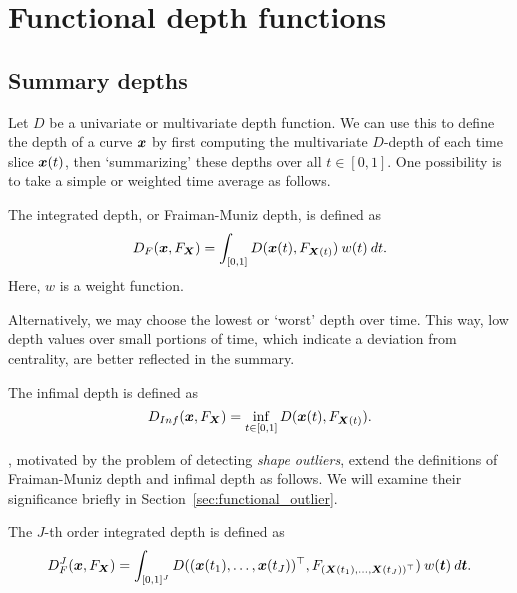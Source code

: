 \section{Functional depth functions}

\subsection{Summary depths}

Let $D$ be a univariate or multivariate depth function.
We can use this to define the depth of a curve $\bm{x}$ by first computing the
multivariate $D$-depth of each time slice $\bm{x}(t)$, then `summarizing' these
depths over all $t \in [0, 1]$.
One possibility is to take a simple or weighted time average as follows.

\begin{definition}
    \label{def:FM_depth}
    The integrated depth, or Fraiman-Muniz depth, is defined as
    \begin{equation}
        D_F(\bm{x}, F_{\bm{X}}) = \int_{[0, 1]} D(\bm{x}(t), F_{\bm{X}(t)})\:w(t)\:dt.
    \end{equation}
    Here, $w$ is a weight function.
\end{definition}

Alternatively, we may choose the lowest or `worst' depth over time.
This way, low depth values over small portions of time, which indicate a
deviation from centrality, are better reflected in the summary.

\begin{definition}
    The infimal depth is defined as
    \begin{equation}
        D_{Inf}(\bm{x}, F_{\bm{X}}) = \inf_{t \in [0, 1]} D(\bm{x}(t), F_{\bm{X}(t)}).
    \end{equation}
\end{definition}


\textcite{nagy-gijbels-hlubinka-2017}, motivated by the problem of detecting
\emph{shape outliers}, extend the definitions of Fraiman-Muniz depth and
infimal depth as follows.
We will examine their significance briefly in
Section~\ref{sec:functional_outlier}.

\begin{definition} \label{def:J_FM_depth}
    The $J$-th order integrated depth is defined as
    \begin{equation}
        D_F^J(\bm{x}, F_{\bm{X}}) = \int_{[0, 1]^J} D((\bm{x}(t_1), \dots, \bm{x}(t_J))^\top, F_{(\bm{X}(t_1), \dots, \bm{X}(t_J))^\top}) \:w(\bm{t})\:d\bm{t}.
    \end{equation}
\end{definition}

